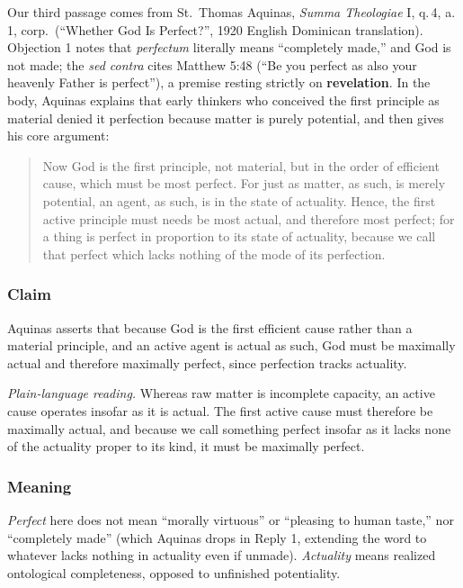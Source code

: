 Our third passage comes from St.\ Thomas Aquinas, \emph{Summa Theologiae} I, q.\,4, a.\,1, corp.\ (``Whether God Is Perfect?'', 1920 English Dominican translation). Objection 1 notes that \emph{perfectum} literally means ``completely made,'' and God is not made; the \emph{sed contra} cites Matthew 5:48 (``Be you perfect as also your heavenly Father is perfect''), a premise resting strictly on \textbf{revelation}. In the body, Aquinas explains that early thinkers who conceived the first principle as material denied it perfection because matter is purely potential, and then gives his core argument:

\begin{quote}
Now God is the first principle, not material, but in the order of efficient cause, which must be most perfect. For just as matter, as such, is merely potential, an agent, as such, is in the state of actuality. Hence, the first active principle must needs be most actual, and therefore most perfect; for a thing is perfect in proportion to its state of actuality, because we call that perfect which lacks nothing of the mode of its perfection.
\end{quote}

\subsubsection*{Claim}

Aquinas asserts that because God is the first efficient cause rather than a material principle, and an active agent is actual as such, God must be maximally actual and therefore maximally perfect, since perfection tracks actuality.

\emph{Plain-language reading.} Whereas raw matter is incomplete capacity, an active cause operates insofar as it is actual. The first active cause must therefore be maximally actual, and because we call something perfect insofar as it lacks none of the actuality proper to its kind, it must be maximally perfect.

\subsubsection*{Meaning}

\emph{Perfect} here does not mean ``morally virtuous'' or ``pleasing to human taste,'' nor ``completely made'' (which Aquinas drops in Reply 1, extending the word to whatever lacks nothing in actuality even if unmade). \emph{Actuality} means realized ontological completeness, opposed to unfinished potentiality.

